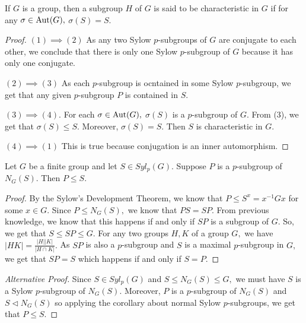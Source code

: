 \begin{definition}
	If $G$ is a group, then a subgroup $H$ of $G$ is said to be characteristic
	in $G$ if for any $ \sigma \in \operatorname{Aut}(G),$ $ \sigma(S) = S.$
\end{definition}

\begin{proof}
	$ (1) \implies (2) $
	As any two Sylow $p$\nobreakdash-subgroups of $G$ are conjugate to each other,
	we conclude that there is only one Sylow $p$\nobreakdash-subgroup of $G$
	because it has only one conjugate.
	
	$(2) \implies (3) $
	As each $p$\nobreakdash-subgroup is ocntained in some Sylow $p$\nobreakdash-subgroup,
	we get that any given $p$\nobreakdash-subgroup $P$ is contained in $S.$
	
	$(3) \implies (4).$
	For each $ \sigma \in \operatorname{Aut}(G),$
	$ \sigma (S) $ is a $p$\nobreakdash-subgroup of $G.$
	From (3), we get that $ \sigma(S) \leq S.$
	Moreover, $ \sigma(S) = S.$ Then $S$ is characteristic in $G.$

	$(4) \implies (1) $
	This is true because conjugation is an inner automorphism.
\end{proof}

\begin{lemma} \label{lem:p-subgroup-of-normaliser}
	Let $G$ be a finite group and let $S \in Syl_p(G).$
	Suppose $P$ is a $p$\nobreakdash-subgroup of $N_G(S).$
	Then $P \leq S.$
\end{lemma}

\begin{proof}
	By the Sylow's Development Theorem, we know that $P \leq S^x 
	= x^{-1}G x$ for some $x \in G.$
	Since $P \leq N_G(S),$ we know that $PS = SP.$
	From previous knowledge, we know that this happens if and only if 
	$SP$ is a subgroup of $G.$
	So, we get that $S \leq SP \leq G.$
	For any two groups $H, K $ of a group $G,$ we have
	$ \lvert H K \rvert = \frac{ \lvert H \rvert \lvert K \rvert}{ \lvert H \cap K \rvert}.$
	As $SP$ is also a $p$\nobreakdash-subgroup and
	$S$ is a maximal $p$\nobreakdash-subgroup in $G,$ we get that 
	$SP = S$ which happens if and only if $S = P.$
\end{proof}

\begin{proof}[Alternative Proof]
	Since $S \in Syl_p(G)$ and $S \leq N_G(S) \leq G,$ we must have
	$S$ is a Sylow $p$\nobreakdash-subgroup of $N_G(S).$	
	Moreover, $P$ is a $p$\nobreakdash-subgroup of $N_G(S)$
	and $S \triangleleft N_G(S)$ so applying the corollary about normal Sylow
	$p$\nobreakdash-subgroups, we get that $P \leq S.$
\end{proof}

